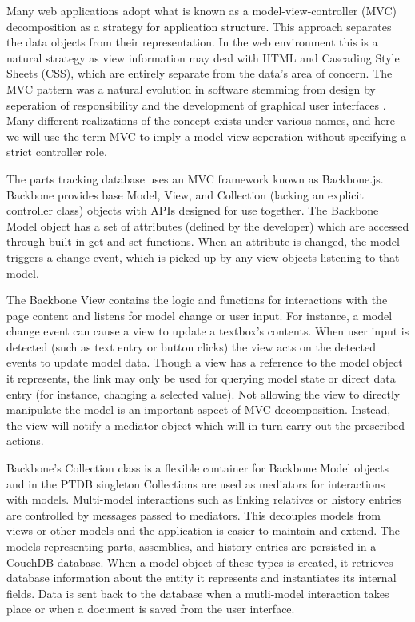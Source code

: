 \documentclass[journal]{IEEEtran}
\begin{document}
Many web applications adopt what is known as a model-view-controller (MVC) decomposition
as a strategy for application structure. This approach separates the data objects from
their representation. In the web environment this is a natural strategy as view information
may deal with HTML and Cascading Style Sheets (CSS), which are entirely separate from the data's area of concern.
The MVC pattern was a natural evolution in software stemming from design by
seperation of responsibility and the development of graphical user interfaces \cite{krasner1988description}. Many different realizations
of the concept exists under various names, and here we will use the term MVC to imply
a model-view seperation without specifying a strict controller role.

The parts tracking database uses an MVC framework known as Backbone.js. Backbone provides
base Model, View, and Collection (lacking an explicit controller class)
objects with APIs designed for use together. 
The Backbone Model 
object has a set of attributes (defined by the developer) which are accessed through
built in get and set functions.
When an attribute is changed, the model triggers a change event, which is picked
up by any view objects listening to that model.

The Backbone View contains the logic and functions for interactions with the page content
and listens for model change or user input.
For instance, a model change event can cause a view to update a textbox's contents.
When user input is detected (such as text entry or button clicks) the view acts 
on the detected events to update model data.
Though a view has a reference to the model object it represents,
the link may only be used for querying model state or direct data entry (for instance,
changing a selected value). Not allowing the view to directly manipulate
the model is an important aspect of MVC decomposition. Instead, the
view will notify a mediator object which will in turn carry out the prescribed actions.

Backbone's Collection class is a flexible container for Backbone Model objects and in the PTDB
singleton Collections are used as mediators for interactions with models.
Multi-model interactions such as linking relatives or history entries are controlled by messages
passed to mediators.
This decouples models from views or other models and the
application is easier to maintain and extend. 
The models representing parts, assemblies, and history entries are persisted in 
a CouchDB database. When a model object of these types is created, it retrieves database information
about the entity it represents and instantiates its internal fields. Data is sent back to the
database when a mutli-model interaction takes place or when a document is saved from the user interface.
\end{document}
